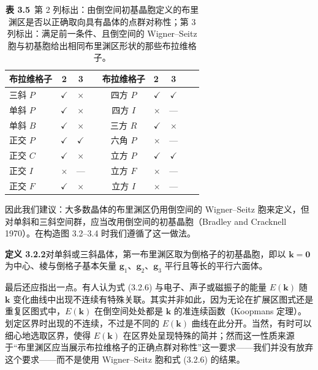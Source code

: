 \begin{table}[H]
\centering
\caption*{\textbf{表 3.5}\ 第 2 列标出：由倒空间初基晶胞定义的布里渊区是否以正确取向具有晶体的点群对称性；第 3 列标出：满足前一条件、且倒空间的 Wigner--Seitz 胞与初基胞给出相同布里渊区形状的那些布拉维格子。}
\begin{tabular}{@{}lcccclccc@{}}
\toprule
布拉维格子 & 2 & 3 & \phantom{xxxx} & 布拉维格子 & 2 & 3 \\
\midrule
三斜 $P$   & $\checkmark$ & $\times$ & & 四方 $P$ & $\checkmark$ & $\checkmark$ \\
单斜 $P$   & $\checkmark$ & $\times$ & & 四方 $I$ & $\times$ & --- \\
单斜 $B$   & $\checkmark$ & $\times$ & & 三方 $R$ & $\checkmark$ & $\times$ \\
正交 $P$   & $\checkmark$ & $\checkmark$ & & 六角 $P$ & $\times$ & --- \\
正交 $C$   & $\checkmark$ & $\times$ & & 立方 $P$ & $\checkmark$ & $\checkmark$ \\
正交 $I$   & $\times$ & --- & & 立方 $F$ & $\times$ & --- \\
正交 $F$   & $\checkmark$ & $\times$ & & 立方 $I$ & $\times$ & --- \\
\bottomrule
\end{tabular}
\end{table}

因此我们建议：大多数晶体的布里渊区仍用倒空间的 Wigner--Seitz 胞来定义，但对单斜和三斜空间群，应当改用倒空间的初基晶胞（Bradley and Cracknell 1970）。在构造图 3.2--3.4 时我们遵循了这一做法。

\noindent\textbf{定义 3.2.2}\quad 对单斜或三斜晶体，第一布里渊区取为倒格子的初基晶胞，即以 $\mathbf{k} = \mathbf{0}$ 为中心、棱与倒格子基本矢量 $\mathbf{g}_{1}$、$\mathbf{g}_{2}$、$\mathbf{g}_{3}$ 平行且等长的平行六面体。

最后还应指出一点。有人认为式 (3.2.6) 与电子、声子或磁振子的能量 $E(\mathbf{k})$ 随 $\mathbf{k}$ 变化曲线中出现不连续有特殊关联。其实并非如此，因为无论在扩展区图式还是重复区图式中，$E(\mathbf{k})$ 在倒空间处处都是 $\mathbf{k}$ 的准连续函数（Koopmans 定理）。划定区界时出现的不连续，不过是不同的 $E(\mathbf{k})$ 曲线在此分开。当然，有时可以细心地选取区界，使得 $E(\mathbf{k})$ 在区界处呈现特殊的简并；然而这一性质来源于“布里渊区应当展示布拉维格子的正确点群对称性”这一要求——我们并没有放弃这个要求——而不是使用 Wigner--Seitz 胞和式 (3.2.6) 的结果。

